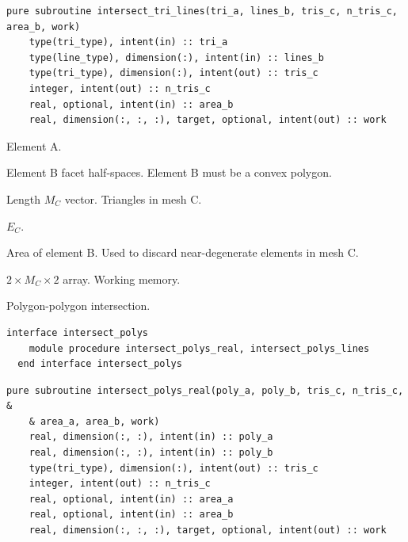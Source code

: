 \documentclass{article}
\begin{document}
\begin{lstlisting}[language=FORTRAN]
  pure subroutine intersect_tri_lines(tri_a, lines_b, tris_c, n_tris_c, area_b, work)
    type(tri_type), intent(in) :: tri_a
    type(line_type), dimension(:), intent(in) :: lines_b
    type(tri_type), dimension(:), intent(out) :: tris_c
    integer, intent(out) :: n_tris_c
    real, optional, intent(in) :: area_b
    real, dimension(:, :, :), target, optional, intent(out) :: work
\end{lstlisting}

\begin{description}[font=\ttfamily\bfseries,leftmargin=2.2\parindent,labelindent=1.7\parindent,noitemsep]
  \item[tri\_a] Element A.
  \item[lines\_b] Element B facet half-spaces. Element B must be a convex
    polygon.
  \item[tris\_c] Length $M_C$ vector. Triangles in mesh C.
  \item[n\_tris\_c] $E_C$.
  \item[area\_b] Area of element B. Used to discard near-degenerate elements in
    mesh C.
  \item[work] $2 \times M_C \times 2$ array. Working memory.
\end{description}

\noindent Polygon-polygon intersection.
  
\begin{lstlisting}[language=FORTRAN]
  interface intersect_polys
    module procedure intersect_polys_real, intersect_polys_lines
  end interface intersect_polys
\end{lstlisting}
  
\begin{lstlisting}[language=FORTRAN]
  pure subroutine intersect_polys_real(poly_a, poly_b, tris_c, n_tris_c, &
    & area_a, area_b, work)
    real, dimension(:, :), intent(in) :: poly_a
    real, dimension(:, :), intent(in) :: poly_b
    type(tri_type), dimension(:), intent(out) :: tris_c
    integer, intent(out) :: n_tris_c
    real, optional, intent(in) :: area_a
    real, optional, intent(in) :: area_b
    real, dimension(:, :, :), target, optional, intent(out) :: work
\end{lstlisting}
\end{document}
